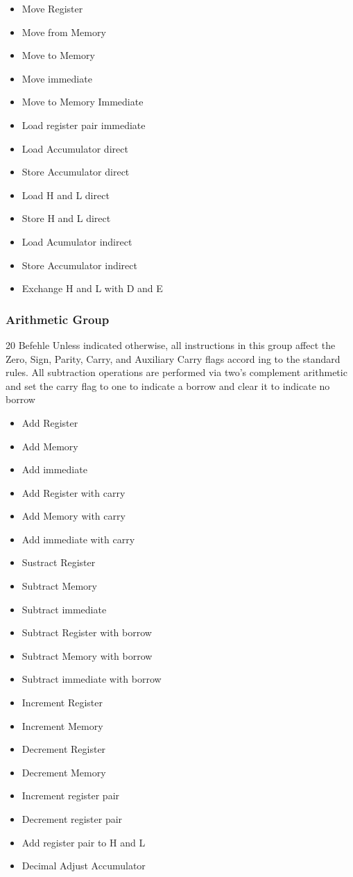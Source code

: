 \documentclass[12pt]{article}
\begin{document}
\begin{multicols}{2}
\begin{itemize}
\item Move Register
\item Move from Memory
\item Move to Memory
\item Move immediate
\item Move to Memory Immediate
\item Load register pair immediate
\item Load Accumulator direct
\item Store Accumulator direct
\item Load H and L direct
\item Store H and L direct
\item Load Acumulator indirect
\item Store Accumulator indirect
\item Exchange H and L with D and E
\end{itemize}
\end{multicols}


\subsubsection{Arithmetic Group}
20 Befehle
Unless indicated otherwise, all instructions in this
group affect the Zero, Sign, Parity, Carry, and Auxiliary
Carry flags accord ing to the standard rules.
All subtraction operations are performed via two's
complement arithmetic and set the carry flag to one to indicate a borrow and clear it to indicate no borrow

\begin{multicols}{2}
\begin{itemize}
\item Add Register
\item Add Memory
\item Add immediate
\item Add Register with carry
\item Add Memory with carry
\item Add immediate with carry
\item Sustract Register
\item Subtract Memory
\item Subtract immediate
\item Subtract Register with borrow
\item Subtract Memory with borrow
\item Subtract immediate with borrow
\item Increment Register
\item Increment Memory
\item Decrement Register
\item Decrement Memory
\item Increment register pair
\item Decrement register pair
\item Add register pair to H and L
\item Decimal Adjust Accumulator
\end{itemize}
\end{multicols}
\end{document}
